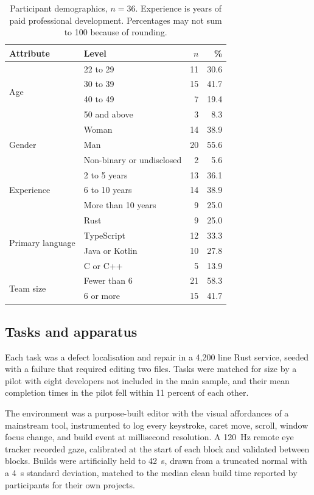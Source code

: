 \begin{table}[t]
  \centering
  \footnotesize
  \caption{Participant demographics, $n = 36$. Experience is years of paid
  professional development. Percentages may not sum to 100 because of
  rounding.}
  \label{tab:demographics}
  \begin{tabular}{llrr}
    \toprule
    Attribute & Level & $n$ & \% \\
    \midrule
    \multirow{4}{*}{Age}
      & 22 to 29 & 11 & 30.6 \\
      & 30 to 39 & 15 & 41.7 \\
      & 40 to 49 &  7 & 19.4 \\
      & 50 and above & 3 & 8.3 \\
    \midrule
    \multirow{3}{*}{Gender}
      & Woman & 14 & 38.9 \\
      & Man & 20 & 55.6 \\
      & Non-binary or undisclosed & 2 & 5.6 \\
    \midrule
    \multirow{3}{*}{Experience}
      & 2 to 5 years & 13 & 36.1 \\
      & 6 to 10 years & 14 & 38.9 \\
      & More than 10 years & 9 & 25.0 \\
    \midrule
    \multirow{4}{*}{Primary language}
      & Rust & 9 & 25.0 \\
      & TypeScript & 12 & 33.3 \\
      & Java or Kotlin & 10 & 27.8 \\
      & C or C++ & 5 & 13.9 \\
    \midrule
    \multirow{2}{*}{Team size}
      & Fewer than 6 & 21 & 58.3 \\
      & 6 or more & 15 & 41.7 \\
    \bottomrule
  \end{tabular}
\end{table}

\subsection{Tasks and apparatus}

Each task was a defect localisation and repair in a 4{,}200 line Rust service,
seeded with a failure that required editing two files. Tasks were matched for
size by a pilot with eight developers not included in the main sample, and
their mean completion times in the pilot fell within 11 percent of each other.

The environment was a purpose-built editor with the visual affordances of a
mainstream tool, instrumented to log every keystroke, caret move, scroll,
window focus change, and build event at millisecond resolution. A 120~Hz remote
eye tracker recorded gaze, calibrated at the start of each block and validated
between blocks. Builds were artificially held to 42~s, drawn from a truncated
normal with a 4~s standard deviation, matched to the median clean build time
reported by participants for their own projects.

